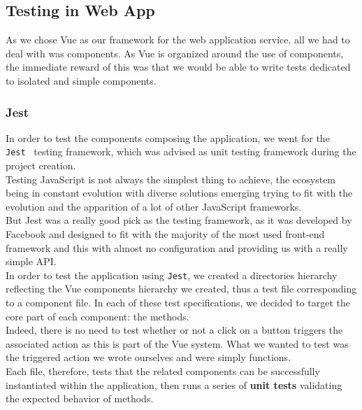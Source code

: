 \documentclass{eplmastersthesis}
\begin{document}
      \subsection{Testing in Web App}

        As we chose Vue as our framework for the web application service,
        all we had to deal with was components. As Vue is organized around
        the use of components, the immediate reward of this was that we would
        be able to write tests dedicated to isolated and simple components.

        \subsubsection{Jest}

          In order to test the components composing the application, we
          went for the \texttt{Jest}~\cite{jest} testing framework, which was advised
          as unit testing framework during the project creation.\\

          Testing JavaScript is not always the simplest thing to achieve, the
          ecosystem being in constant evolution with diverse solutions emerging
          trying to fit with the evolution and the apparition of a lot of
          other JavaScript frameworks.\\
          But Jest was a really good pick as the testing framework, as it was
          developed by Facebook and designed to fit with the majority of the
          most used front-end framework and this with almost no configuration and
          providing us with a really simple API.\\

          In order to test the application using \texttt{Jest}, we created a directories
          hierarchy reflecting the Vue components hierarchy we created, thus
          a test file corresponding to a component file. In each of these
          test specifications, we decided to target the core part of each
          component: the methods.\\
          Indeed, there is no need to test whether or not a click on a button
          triggers the associated action as this is part of the Vue system. What
          we wanted to test was the triggered action we wrote ourselves and
          were simply functions.\\
          Each file, therefore, tests that the related components can be
          successfully instantiated within the application, then runs a series
          of \textbf{unit tests} validating the expected behavior of methods.
\end{document}
